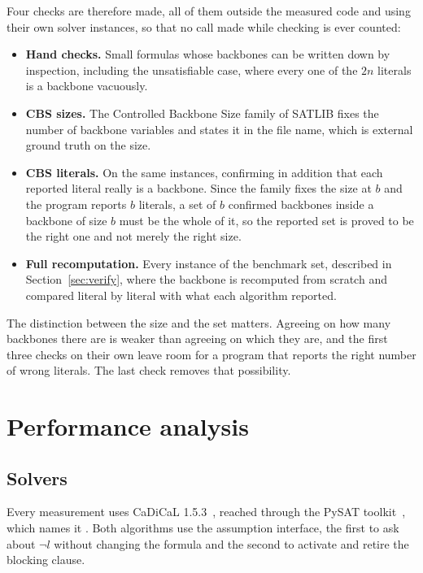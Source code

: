 \documentclass[11pt,a4paper]{article}
\begin{document}
Four checks are therefore made, all of them outside the measured code and
using their own solver instances, so that no call made while checking is ever
counted:

\begin{itemize}
  \item \textbf{Hand checks.} Small formulas whose backbones can be written
  down by inspection, including the unsatisfiable case, where every one of the
  $2n$ literals is a backbone vacuously.
  \item \textbf{CBS sizes.} The Controlled Backbone Size family of SATLIB
  fixes the number of backbone variables and states it in the file name, which
  is external ground truth on the size.
  \item \textbf{CBS literals.} On the same instances, confirming in addition
  that each reported literal really is a backbone. Since the family fixes the
  size at $b$ and the program reports $b$ literals, a set of $b$ confirmed
  backbones inside a backbone of size $b$ must be the whole of it, so the
  reported set is proved to be the right one and not merely the right size.
  \item \textbf{Full recomputation.} Every instance of the benchmark set,
  described in Section~\ref{sec:verify}, where the backbone is recomputed from
  scratch and compared literal by literal with what each algorithm reported.
\end{itemize}

The distinction between the size and the set matters. Agreeing on how many
backbones there are is weaker than agreeing on which they are, and the first
three checks on their own leave room for a program that reports the right
number of wrong literals. The last check removes that possibility.

\section{Performance analysis}

\subsection*{Solvers}

Every measurement uses CaDiCaL 1.5.3~\cite{cadical}, reached through the PySAT
toolkit~\cite{pysat}, which names it . Both
algorithms use the assumption interface, the first to ask about $\neg l$
without changing the formula and the second to activate and retire the
blocking clause.
\end{document}
